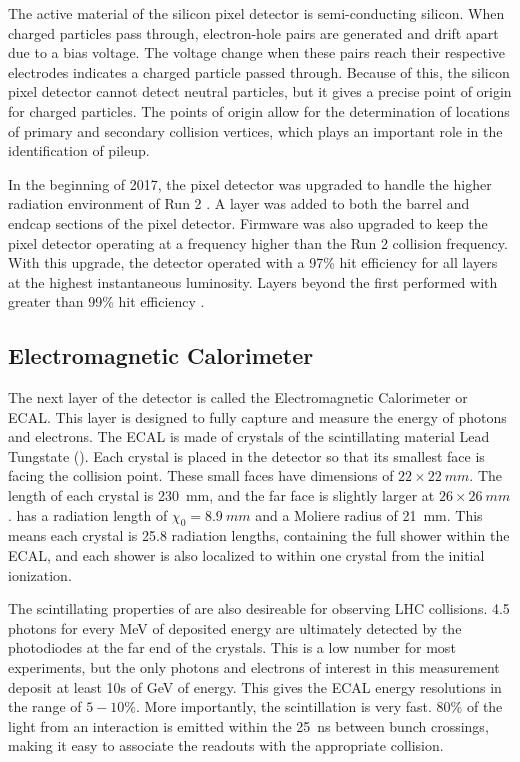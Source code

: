 The active material of the silicon pixel detector is semi-conducting silicon.
When charged particles pass through,
electron-hole pairs are generated and drift apart due to a bias voltage.
The voltage change when these pairs reach their respective electrodes indicates a charged particle passed through.
Because of this, the silicon pixel detector cannot detect neutral particles,
but it gives a precise point of origin for charged particles.
The points of origin allow for the determination of locations of primary and secondary
collision vertices, which plays an important role in the identification of pileup.

In the beginning of 2017, the pixel detector was upgraded to handle the higher radiation environment of Run 2 \cite{Dominguez:1481838}.
A layer was added to both the barrel and endcap sections of the pixel detector.
Firmware was also upgraded to keep the pixel detector operating at a frequency higher than the Run 2 collision frequency.
With this upgrade, the detector operated with a 97\% hit efficiency for all layers at the highest instantaneous luminosity.
Layers beyond the first performed with greater than 99\% hit efficiency \cite{Modak:2712284}.

\subsection{Electromagnetic Calorimeter} \label{sec:ecal}

The next layer of the detector is called the Electromagnetic Calorimeter or ECAL.
This layer is designed to fully capture and measure the energy of photons and electrons.
The ECAL is made of crystals of the scintillating material Lead Tungstate ().
Each crystal is placed in the detector so that its smallest face is facing the collision point.
These small faces have dimensions of $22\times\SI{22}{mm}$.
The length of each crystal is \SI{230}{mm},
and the far face is slightly larger at $26\times\SI{26}{mm}$.
 has a radiation length of $\chi_0 = \SI{8.9}{mm}$ and a Moliere radius of \SI{21}{mm}.
This means each crystal is 25.8 radiation lengths, containing the full shower within the ECAL,
and each shower is also localized to within one crystal from the initial ionization.

The scintillating properties of  are also desireable for observing LHC collisions.
4.5 photons for every MeV of deposited energy are ultimately detected by the photodiodes at the far end of the crystals.
This is a low number for most experiments, but the only photons and electrons of interest in this measurement deposit at least 10s of GeV of energy.
This gives the ECAL energy resolutions in the range of $5-10\%$.
More importantly, the scintillation is very fast.
80\% of the light from an interaction is emitted within the \SI{25}{ns} between bunch crossings,
making it easy to associate the readouts with the appropriate collision.

